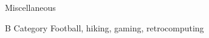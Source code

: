 
\begin{rubric}{Miscellaneous}

  B Category
\entry*[Hobbies:]
  Football, hiking,  gaming, retrocomputing 

\end{rubric}

